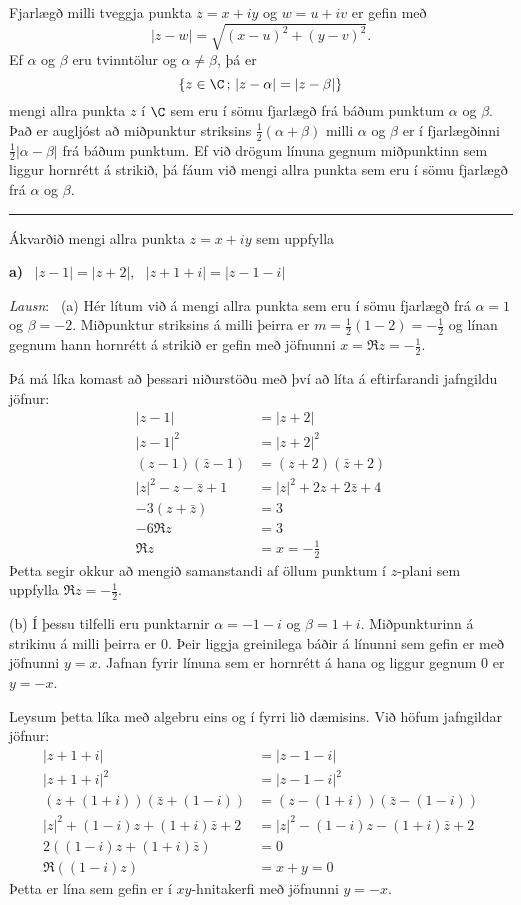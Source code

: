 Fjarlægð milli tveggja punkta $z=x+iy$ og $w=u+iv$ er gefin með
$$
|z-w|=\sqrt{(x-u)^2+(y-v)^2}.
$$
Ef $\alpha$ og $\beta$ eru tvinntölur og $\alpha\neq
\beta$, þá er 
$$\{z\in \C\,;\, |z-\alpha|=|z-\beta|\}
$$ mengi allra punkta
$z$ í $\C$ sem eru í sömu fjarlægð frá báðum punktum $\alpha$ og
$\beta$.  Það er augljóst að miðpunktur striksins $\frac
12(\alpha+\beta)$ milli $\alpha$ og $\beta$ er í fjarlægðinni
$\frac 12|\alpha-\beta|$ frá báðum punktum.  Ef við drögum línuna 
gegnum miðpunktinn sem
liggur hornrétt á strikið, þá fáum við mengi allra punkta sem eru í
sömu fjarlægð frá $\alpha$ og $\beta$.

\bigskip\hrule\bigskip

\begin{sy}  Ákvarðið mengi allra punkta $z=x+iy$ sem uppfylla

\smallskip
{\bf a)} \ $|z-1|=|z+2|$,  \ $|z+1+i|=|z-1-i|$


\medskip
{\it Lausn}: \ (a) Hér lítum við á mengi allra punkta 
sem eru í sömu fjarlægð frá $\alpha=1$ og $\beta=-2$.  Miðpunktur
striksins á milli þeirra er $m=\tfrac 12(1-2)=-\tfrac 12$ og línan
gegnum hann hornrétt á strikið er gefin með jöfnunni $x=\Re z=-\tfrac
12$.


Þá má líka komast að þessari niðurstöðu með því að líta á
eftirfarandi jafngildu jöfnur:
\begin{align*}
|z-1|&=|z+2| \\
|z-1|^2&=|z+2|^2 \\
(z-1)(\bar z-1)&=(z+2)(\bar z+2) \\
|z|^2-z-\bar z+1&=|z|^2+2z+2\bar z+4\\
-3(z+\bar z)&=3\\
-6\Re z&=3\\
\Re z&=x=-\tfrac 12
\end{align*} 
Þetta segir okkur að mengið samanstandi  af öllum punktum 
í $z$-plani sem uppfylla $\Re z=-\tfrac 12$.

\smallskip\noindent
(b) Í þessu tilfelli eru punktarnir $\alpha=-1-i$ og $\beta=1+i$.
Miðpunkturinn á strikinu á milli þeirra er $0$.  Þeir liggja
greinilega báðir á línunni sem gefin er með jöfnunni $y=x$. Jafnan
fyrir línuna sem er hornrétt á hana og liggur gegnum $0$ er
$y=-x$.

Leysum þetta líka með algebru eins og í fyrri lið dæmisins.
Við höfum jafngildar jöfnur:
\begin{align*}
|z+1+i|&=|z-1-i| \\
|z+1+i|^2&=|z-1-i|^2 \\
(z+(1+i))(\bar z+(1-i))&=(z-(1+i))(\bar
z-(1-i)) \\
|z|^2+(1-i)z+(1+i)\bar z+2&=|z|^2-(1-i)z-(1+i)\bar z+2\\
2((1-i)z+(1+i)\bar z)&=0\\
\Re ((1-i)z)&=x+y=0
\end{align*} 
Þetta er lína sem gefin er í $xy$-hnitakerfi með jöfnunni
$y=-x$.
\end{sy}

